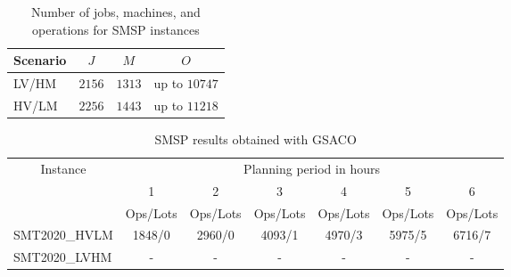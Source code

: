 \documentclass[runningheads]{llncs}
\begin{document}
\begin{table}[t]
\caption{Number of jobs, machines, and operations for SMSP instances}\label{tab:Dataset} \centering
\begin{tabular}{|l|c|c|c|}
	\hline
	Scenario & $J$    & $M$    & $O$              \\ \hline
	LV/HM    & $2156$ & $1313$ & up to $10747$    \\ 
	HV/LM    & $2256$ & $1443$ & up to $11218$    \\
	\hline
\end{tabular}
\end{table}
%

\begin{table}[]
	\caption{SMSP results obtained with GSACO}	\label{tab:results-operations} \centering
	\begin{tabular}{|l|cccccc|}
		\hline
		\multicolumn{1}{|c|}{\multirow{2}{*}{Instance}} &
		\multicolumn{6}{c|}{Planning period in hours} \\ \cline{2-7} 
		\multicolumn{1}{|c|}{} &
		\multicolumn{1}{c|}{1} &
		\multicolumn{1}{c|}{2} &
		\multicolumn{1}{c|}{3} &
		\multicolumn{1}{c|}{4} &
		\multicolumn{1}{c|}{5} &
		6 \\ \hline &
		\multicolumn{1}{l|}{Ops/Lots} &
		\multicolumn{1}{l|}{Ops/Lots} &
		\multicolumn{1}{l|}{Ops/Lots} &
		\multicolumn{1}{l|}{Ops/Lots} &
		\multicolumn{1}{c|}{Ops/Lots} &
		\multicolumn{1}{l|}{Ops/Lots} \\ \cline{2-7} 
		SMT2020\_HVLM &
		\multicolumn{1}{c|}{1848/0} &
		\multicolumn{1}{c|}{2960/0} &
		\multicolumn{1}{c|}{4093/1} &
		\multicolumn{1}{c|}{4970/3} &
		\multicolumn{1}{c|}{5975/5} &
		6716/7 \\
		SMT2020\_LVHM &
		\multicolumn{1}{c|}{-} &
		\multicolumn{1}{c|}{-} &
		\multicolumn{1}{c|}{-} &
		\multicolumn{1}{c|}{-} &
		\multicolumn{1}{c|}{-} &
		- \\ \hline
	\end{tabular}%
\end{table}
\end{document}
